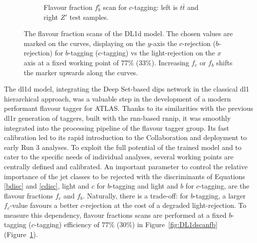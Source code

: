\begin{figure}[h!]
\begin{subfigure}[b]{\textwidth}
    \caption{Flavour fraction $f_b^c$ scan for $c$-tagging: left is $t\bar{t}$ and right $Z'$ test samples.} 
    \label{fig:DL1dscanfc}
\end{subfigure}
  \caption{The flavour fraction scans of the DL1d model. The chosen values are marked on the curves, displaying on the $y$-axis the $c$-rejection ($b$-rejection) for $b$-tagging ($c$-tagging) vs the light-rejection on the $x$ axis at a fixed working point of 77\% (33\%). Increasing $f_c$ or $f_b$ shifts the marker upwards along the curves. }
  \label{fig:DL1dscanf}
\end{figure} 

The \gls{dl1d} model, integrating the Deep Set-based \gls{dips} network in the classical \gls{dl1} hierarchical approach, was a valuable step in the development of a modern performant flavour tagger for ATLAS. Thanks to its similarities with the previous \gls{dl1r} generation of taggers, built with the \gls{rnn}-based \gls{rnnip}, it was smoothly integrated into the processing pipeline of the flavour tagger group. Its fast calibration led to its rapid introduction to the Collaboration and deployment to early Run 3 analyses. To exploit the full potential of the trained model and to cater to the specific needs of individual analyses, several working points are centrally defined and calibrated. An important parameter to control the relative importance of the jet classes to be rejected with the discriminants of Equations \ref{bdisc} and \ref{cdisc}, light and $c$ for $b$-tagging and light and $b$ for $c$-tagging, are the flavour fractions $f_c$ and $f_b$. Naturally, there is a trade-off: for $b$-tagging, a larger $f_c$-value favours a better $c$-rejection at the cost of a degraded light-rejection. To measure this dependency, flavour fractions scans are performed at a fixed $b$-tagging ($c$-tagging) efficiency of 77\% (30\%) in Figure~\ref{fig:DL1dscanfb} (Figure~\ref{fig:DL1dscanfc}). \\

